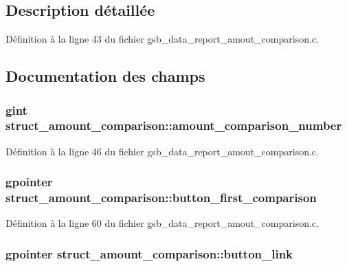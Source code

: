 \subsection{Description détaillée}


Définition à la ligne 43 du fichier gsb\_\-data\_\-report\_\-amout\_\-comparison.c.



\subsection{Documentation des champs}
\subsubsection[{amount\_\-comparison\_\-number}]{\setlength{\rightskip}{0pt plus 5cm}gint {\bf struct\_\-amount\_\-comparison::amount\_\-comparison\_\-number}}\label{structstruct__amount__comparison_a6c212d5284af9dd7f99daa3ca534f19b}


Définition à la ligne 46 du fichier gsb\_\-data\_\-report\_\-amout\_\-comparison.c.

\subsubsection[{button\_\-first\_\-comparison}]{\setlength{\rightskip}{0pt plus 5cm}gpointer {\bf struct\_\-amount\_\-comparison::button\_\-first\_\-comparison}}\label{structstruct__amount__comparison_a88b53097ed1b18266c45459c802f632b}


Définition à la ligne 60 du fichier gsb\_\-data\_\-report\_\-amout\_\-comparison.c.

\subsubsection[{button\_\-link}]{\setlength{\rightskip}{0pt plus 5cm}gpointer {\bf struct\_\-amount\_\-comparison::button\_\-link}}\label{structstruct__amount__comparison_afcc9e99df1e9449513bc2d653fcc35a5}


